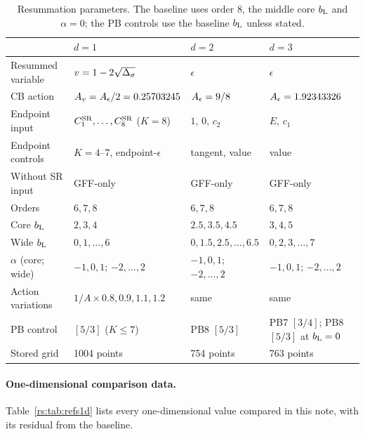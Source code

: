 \begin{table}[htbp]\centering\small\setlength{\tabcolsep}{3.5pt}
\begin{tabular}{@{}l l l l@{}}
\toprule
 & $d=1$ & $d=2$ & $d=3$\\ \midrule
Resummed variable & $v=1-2\sqrt{\Delta_\sigma}$ & $\epsilon$ & $\epsilon$\\
CB action & $A_v=A_\epsilon/2=0.25703245$ & $A_\epsilon=9/8$ & $A_\epsilon=1.92343326$\\
Endpoint input & $C^{\mathrm{SR}}_1,\dots,C^{\mathrm{SR}}_8$ ($K=8$) & $1$, $0$, $c_2$ & $E$, $c_1$\\
Endpoint controls & $K=4$--$7$, endpoint-$\epsilon$ & tangent, value & value\\
Without SR input & GFF-only & GFF-only & GFF-only\\
Orders & $6,7,8$ & $6,7,8$ & $6,7,8$\\
Core $b_{\mathrm L}$ & $2,3,4$ & $2.5,3.5,4.5$ & $3,4,5$\\
Wide $b_{\mathrm L}$ & $0,1,\dots,6$ & $0,1.5,2.5,\dots,6.5$ & $0,2,3,\dots,7$\\
$\alpha$ (core; wide) & $-1,0,1$; $-2,\dots,2$ & $-1,0,1$; $-2,\dots,2$ & $-1,0,1$; $-2,\dots,2$\\
Action variations & $1/A\times0.8,0.9,1.1,1.2$ & same & same\\
PB control & $[5/3]$ ($K\le7$) & PB8 $[5/3]$ & PB7 $[3/4]$; PB8 $[5/3]$ at $b_{\mathrm L}=0$\\
Stored grid & 1004 points & 754 points & 763 points\\
\bottomrule
\end{tabular}
\caption{Resummation parameters. The baseline uses order 8, the middle core $b_{\mathrm L}$ and
$\alpha=0$; the PB controls use the baseline $b_{\mathrm L}$ unless stated.}
\label{rs:tab:params}
\end{table}

\paragraph{One-dimensional comparison data.} Table~\ref{rs:tab:refs1d} lists every
one-dimensional value compared in this note, with its residual from the baseline.

